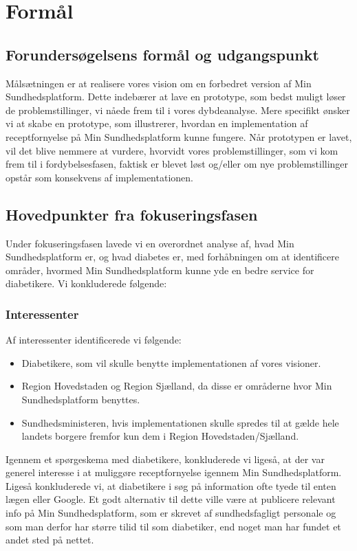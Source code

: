 \section{Formål}
\subsection{Forundersøgelsens formål og udgangspunkt}
Målsætningen er at realisere vores vision om en forbedret version af Min Sundhedsplatform. Dette indebærer at lave en prototype, som bedst muligt løser de problemstillinger, vi nåede frem til i vores dybdeanalyse. Mere specifikt ønsker vi at skabe en prototype, som illustrerer, hvordan en implementation af receptfornyelse på Min Sundhedsplatform kunne fungere. Når prototypen er lavet, vil det blive nemmere at vurdere, hvorvidt vores problemstillinger, som vi kom frem til i fordybelsesfasen, faktisk er blevet løst og/eller om nye problemstillinger opstår som konsekvens af implementationen. 
\subsection{Hovedpunkter fra fokuseringsfasen}
Under fokuseringsfasen lavede vi en overordnet analyse af, hvad Min Sundhedsplatform er, og hvad diabetes er, med forhåbningen om at identificere områder, hvormed Min Sundhedsplatform kunne yde en bedre service for diabetikere. Vi konkluderede følgende:
\subsubsection{Interessenter}
Af interessenter identificerede vi følgende:
\begin{itemize}
\item Diabetikere, som vil skulle benytte implementationen af vores visioner.
\item Region Hovedstaden og Region Sjælland, da disse er områderne hvor Min Sundhedsplatform benyttes.
\item Sundhedsministeren, hvis implementationen skulle spredes til at gælde hele landets borgere fremfor kun dem i Region Hovedstaden/Sjælland.
\end{itemize}
Igennem et spørgeskema med diabetikere, konkluderede vi ligeså, at der var generel interesse i at muliggøre receptfornyelse igennem Min Sundhedsplatform.\\
Ligeså konkluderede vi, at diabetikere i søg på information ofte tyede til enten lægen eller Google. Et godt alternativ til dette ville være at publicere relevant info på Min Sundhedsplatform, som er skrevet af sundhedsfagligt personale og som man derfor har større tilid til som diabetiker, end noget man har fundet et andet sted på nettet. 
